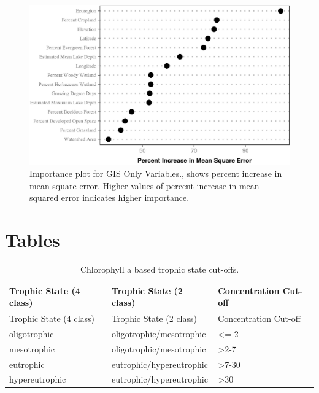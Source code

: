 \documentclass[11pt,]{article}
\begin{document}
\begin{figure}[htbp]
\centering
\includegraphics{manuscript_files/figure-latex/GIS_Importance-1.jpeg}
\caption{Importance plot for GIS Only Variables., shows percent increase
in mean square error. Higher values of percent increase in mean squared
error indicates higher importance. \label{fig:GIS_Importance}}
\end{figure}

\newpage

\newpage

\newpage

\newpage

\newpage

\newpage

\newpage

\section{Tables}\label{tables}

\begin{longtable}[c]{@{}lll@{}}
\caption{Chlorophyll a based trophic state cut-offs.
\label{tab:trophicStateTable}}\tabularnewline
\toprule
Trophic State (4 class) & Trophic State (2 class) & Concentration
Cut-off\tabularnewline
\midrule
\endfirsthead
\toprule
Trophic State (4 class) & Trophic State (2 class) & Concentration
Cut-off\tabularnewline
\midrule
\endhead
oligotrophic & oligotrophic/mesotrophic & \textless{}= 2\tabularnewline
mesotrophic & oligotrophic/mesotrophic &
\textgreater{}2-7\tabularnewline
eutrophic & eutrophic/hypereutrophic & \textgreater{}7-30\tabularnewline
hypereutrophic & eutrophic/hypereutrophic &
\textgreater{}30\tabularnewline
\bottomrule
\end{longtable}
\end{document}
